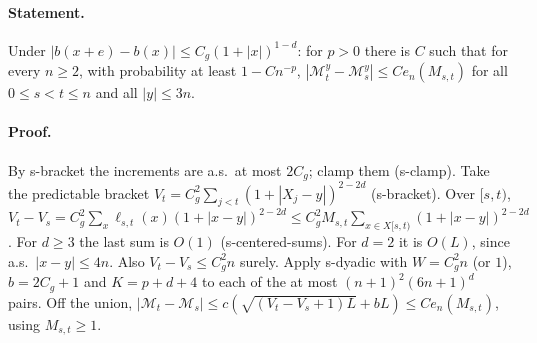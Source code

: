 \paragraph{Statement.} Under $|b(x+e)-b(x)|\leq C_g(1+|x|)^{1-d}$: for $p>0$ there is $C$ such that for every $n\geq2$, with probability
at least $1-Cn^{-p}$, $|\mathcal M^y_t-\mathcal M^y_s|\leq Ce_n(M_{s,t})$ for all $0\leq s<t\leq n$ and all $|y|\leq3n$.
\paragraph{Proof.} By s-bracket the increments are a.s.\ at most $2C_g$; clamp them (s-clamp). Take the predictable bracket
$V_t=C_g^2\sum_{j<t}(1+|X_j-y|)^{2-2d}$ (s-bracket). Over $[s,t)$,
$V_t-V_s=C_g^2\sum_x\ell_{s,t}(x)(1+|x-y|)^{2-2d}\leq C_g^2M_{s,t}\sum_{x\in X[s,t)}(1+|x-y|)^{2-2d}$. For $d\geq3$ the last sum is $O(1)$
(s-centered-sums). For $d=2$ it is $O(L)$, since a.s.\ $|x-y|\leq4n$. Also $V_t-V_s\leq C_g^2n$ surely. Apply s-dyadic with
$W=C_g^2n$ (or $1$), $b=2C_g+1$ and $K=p+d+4$ to each of the at most $(n+1)^2(6n+1)^d$ pairs. Off the union,
$|\mathcal M_t-\mathcal M_s|\leq c(\sqrt{(V_t-V_s+1)L}+bL)\leq Ce_n(M_{s,t})$, using $M_{s,t}\geq1$.
